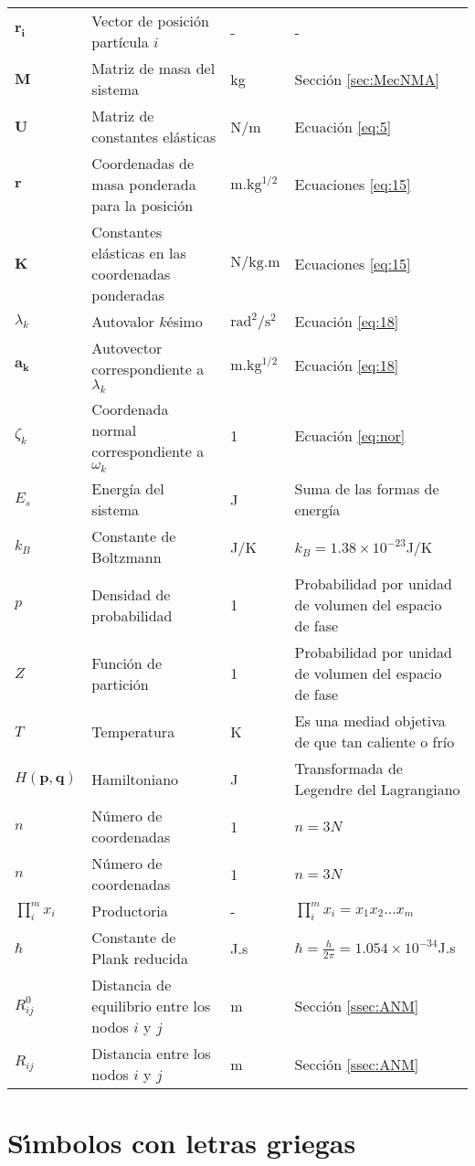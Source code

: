 \begin{longtable}{p{2cm}p{4cm}p{2cm}p{8cm}}
$\mathbf{r_i}$&Vector de posici\'{o}n part\'{i}cula $i$&-&-\\%
$\mathbf{M}$&Matriz de masa del sistema&kg&Secci\'{o}n \ref{sec:MecNMA}\\%
$\mathbf{U}$&Matriz de constantes el\'{a}sticas&N/m&Ecuaci\'{o}n \eqref{eq:5}\\%
$\mathbf{r}$&Coordenadas de masa ponderada para la posici\'{o}n&$\mathrm{m.kg^{1/2}}$ &Ecuaciones \eqref{eq:15}\\%
$\mathbf{K}$&Constantes el\'{a}sticas en las coordenadas ponderadas&$\mathrm{N/kg.m}$ &Ecuaciones \eqref{eq:15}\\%
$\lambda_k$&Autovalor $k$\'{e}simo &$\mathrm{rad^2/s^2}$&Ecuaci\'{o}n \eqref{eq:18}\\%
$\mathbf{a_k}$&Autovector correspondiente a $\lambda_k$&$\mathrm{m.kg^{1/2}}$ &Ecuaci\'{o}n \eqref{eq:18}\\%
$\zeta_k$   &Coordenada normal correspondiente a $\omega_k$&1 &Ecuaci\'{o}n \eqref{eq:nor}\\%
$E_s$&Energ\'{i}a del sistema &J  &Suma de las formas de energ\'{i}a\\%
$k_B$&Constante de Boltzmann &J/K&$k_B=1.38\times 10^{-23}$J/K\\%
$p$&Densidad de probabilidad &1 &Probabilidad por unidad de volumen del espacio de fase\\%
$Z$  &Funci\'{o}n de partici\'{o}n&1 &Probabilidad por unidad de volumen del espacio de fase\\%
$T$ &Temperatura &K &Es una mediad objetiva de que tan caliente o fr\'{i}o\\%
$H(\mathbf{p},\mathbf{q})$ &Hamiltoniano  &J &Transformada de Legendre del Lagrangiano\\%
$n$ &N\'{u}mero de coordenadas    &1 &$n=3N$\\%
$n$&N\'{u}mero de coordenadas   &1 &$n=3N$\\%
$\prod_i^m x_i$&Productoria&-&$\prod_i^m x_i=x_1x_2...x_m$\\%
$\hbar$&Constante de Plank reducida &J.s &$\hbar=\frac{h}{2\pi}=1.054\times 10^{-34}$J.s\\%
$R_{ij}^0$&Distancia de equilibrio entre los nodos $i$ y $j$ &m&Secci\'{o}n \ref{ssec:ANM}\\%
$R_{ij}$&Distancia entre los nodos $i$ y $j$ &m&Secci\'{o}n \ref{ssec:ANM}\\%
\end{longtable}
\vspace{5ex}
\section*{S\'{\i}mbolos con letras griegas}

